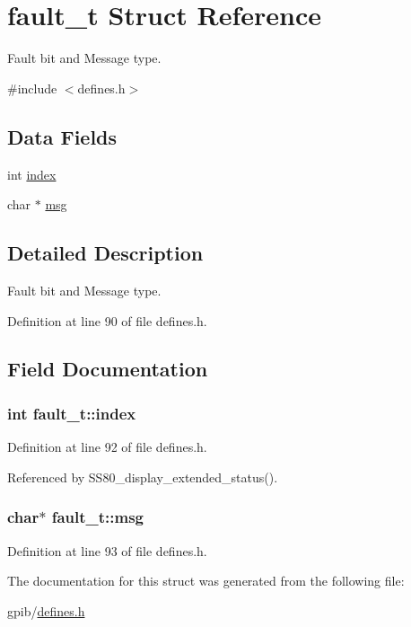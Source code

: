 \hypertarget{structfault__t}{}\section{fault\+\_\+t Struct Reference}
\label{structfault__t}


Fault bit and Message type.  




{\ttfamily \#include $<$defines.\+h$>$}

\subsection*{Data Fields}
\begin{DoxyCompactItemize}
\item 
int \hyperlink{structfault__t_a540c9496df912b65e22c50b6a40535ef}{index}
\item 
char $\ast$ \hyperlink{structfault__t_a9037306efc26edf60b59bc1ee6843c69}{msg}
\end{DoxyCompactItemize}


\subsection{Detailed Description}
Fault bit and Message type. 

Definition at line 90 of file defines.\+h.



\subsection{Field Documentation}
\subsubsection[{\texorpdfstring{index}{index}}]{\setlength{\rightskip}{0pt plus 5cm}int fault\+\_\+t\+::index}\hypertarget{structfault__t_a540c9496df912b65e22c50b6a40535ef}{}\label{structfault__t_a540c9496df912b65e22c50b6a40535ef}


Definition at line 92 of file defines.\+h.



Referenced by S\+S80\+\_\+display\+\_\+extended\+\_\+status().

\subsubsection[{\texorpdfstring{msg}{msg}}]{\setlength{\rightskip}{0pt plus 5cm}char$\ast$ fault\+\_\+t\+::msg}\hypertarget{structfault__t_a9037306efc26edf60b59bc1ee6843c69}{}\label{structfault__t_a9037306efc26edf60b59bc1ee6843c69}


Definition at line 93 of file defines.\+h.



The documentation for this struct was generated from the following file\+:\begin{DoxyCompactItemize}
\item 
gpib/\hyperlink{defines_8h}{defines.\+h}\end{DoxyCompactItemize}
